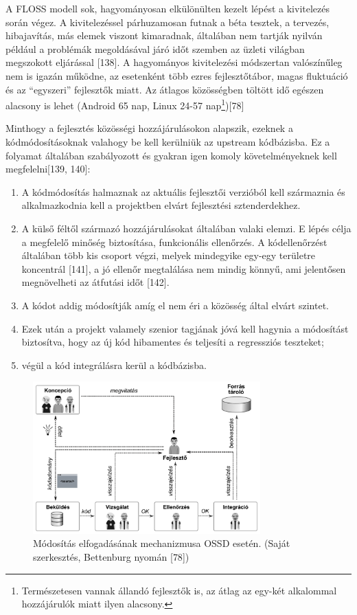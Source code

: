 \documentclass[12pt,magyar,a4paper,oneside]{scrreprt}
\providecommand{\tightlist}{%
  \setlength{\itemsep}{0pt}\setlength{\parskip}{0pt}}
\begin{document}
A FLOSS modell sok, hagyományosan elkülönülten kezelt lépést a
kivitelezés során végez. A kivitelezéssel párhuzamosan futnak a béta
tesztek, a tervezés, hibajavítás, más elemek viszont kimaradnak,
általában nem tartják nyilván például a problémák megoldásával járó időt
szemben az üzleti világban megszokott eljárással {[}138{]}. A
hagyományos kivitelezési módszertan valószínűleg nem is igazán működne,
az esetenként több ezres fejlesztőtábor, magas fluktuáció és az
``egyszeri'' fejlesztők miatt. Az átlagos közösségben töltött idő
egészen alacsony is lehet (Android 65 nap, Linux 24-57
nap\footnote{Természetesen vannak állandó fejlesztők is, az átlag az
  egy-két alkalommal hozzájárulók miatt ilyen alacsony.}){[}78{]}

Minthogy a fejlesztés közösségi hozzájárulásokon alapszik, ezeknek a
kódmódosításoknak valahogy be kell kerülniük az upstream kódbázisba. Ez
a folyamat általában szabályozott és gyakran igen komoly
követelményeknek kell megfelelni{[}139, 140{]}:

\begin{enumerate}
\def\labelenumi{\arabic{enumi}.}
\tightlist
\item
  A kódmódosítás halmaznak az aktuális fejlesztői verzióból kell
  származnia és alkalmazkodnia kell a projektben elvárt fejlesztési
  sztenderdekhez.
\item
  A külső féltől származó hozzájárulásokat általában valaki elemzi. E
  lépés célja a megfelelő minőség biztosítása, funkcionális ellenőrzés.
  A kódellenőrzést általában több kis csoport végzi, melyek mindegyike
  egy-egy területre koncentrál {[}141{]}, a jó ellenőr megtalálása nem
  mindig könnyű, ami jelentősen megnövelheti az átfutási időt {[}142{]}.
\item
  A kódot addig módosítják amíg el nem éri a közösség által elvárt
  szintet.
\item
  Ezek után a projekt valamely szenior tagjának jóvá kell hagynia a
  módosítást biztosítva, hogy az új kód hibamentes és teljesíti a
  regressziós teszteket;
\item
  végül a kód integrálásra kerül a kódbázisba.
\end{enumerate}

\begin{figure}
\centering
\includegraphics[width=0.78\textwidth,height=\textheight]{ábrák/hozzájárulás-módja-bettenburg_management_2015.pdf}
\caption{Módosítás elfogadásának mechanizmusa OSSD esetén. (Saját
szerkesztés, Bettenburg nyomán {[}78{]})}
\end{figure}
\end{document}
